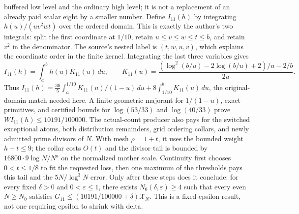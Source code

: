 buffered low level and the ordinary high level; it is not a replacement
of an already paid scalar eight by a smaller number.
Define $I_{11}(h)$ by integrating $h(u)/(uv^2wt)$ over the ordered domain.
This is exactly the author's two integrals: split the first coordinate
at $1/10$, retain $u\le v\le w\le t\le b$, and retain $v^2$ in the denominator.
The source's nested label is $(t,w,u,v)$, which explains the coordinate
order in the finite kernel.  Integrating the last three variables gives
\[
 I_{11}(h)=\int_a^b h(u)K_{11}(u)\,du,\qquad
 K_{11}(u)=\frac{(\log^2(b/u)-2\log(b/u)+2)/u-2/b}{2u}.
\]
Thus $I_{11}(h)=\frac{36}{5}\int_a^{1/10}K_{11}(u)/(1-u)\,du
+8\int_{1/10}^bK_{11}(u)\,du$, the original-domain match needed here.
A finite geometric majorant for $1/(1-u)$, exact primitives, and certified
bounds for $\log(53/33)$ and $\log(40/33)$ prove
$W I_{11}(h)\le10191/100000$.
The actual-count producer also pays for the switched exceptional atoms,
both distribution remainders, grid ordering collars, and newly admitted
prime divisors of $N$.  With mesh $\rho=1+t$, it uses the bounded weight
$h+t\le9$; the collar costs $O(t)$ and the divisor tail is bounded by
$16800\cdot9\log N/N^a$ on the normalized mother scale.
Continuity first chooses $0<t\le1/8$ to fit the requested loss, then
one maximum of the thresholds pays this tail and the $5N/\log^3N$ error.
Only after these steps does it conclude: for every fixed $\delta>0$
and $0<\varepsilon\le1$, there exists $N_0(\delta,\varepsilon)\ge4$
such that every even $N\ge N_0$ satisfies
$G_{11}\le(10191/100000+\delta)\mathcal X_N$.
This is a fixed-epsilon result, not one requiring epsilon to shrink with delta.

